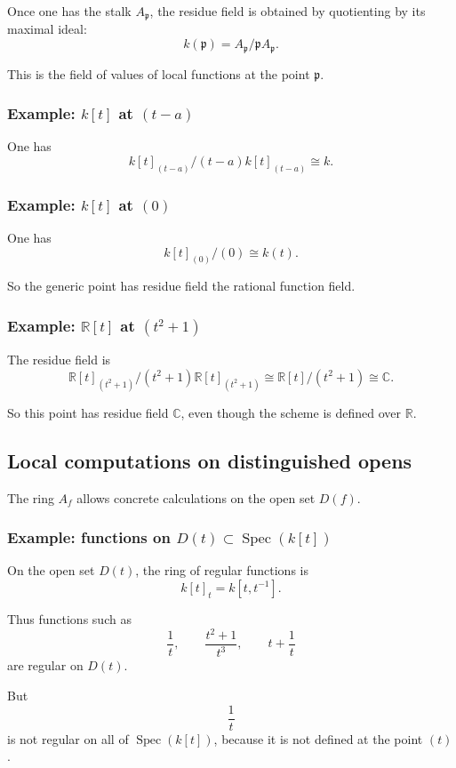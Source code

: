 \documentclass[12pt,a4paper]{article}
\theoremstyle{notespace}
\newcommand{\Spec}{\operatorname{Spec}}
\newcommand{\mf}{\mathfrak}
\theoremstyle{definition}
\begin{document}
Once one has the stalk \(A_{\mf p}\), the residue field is obtained by quotienting by its maximal ideal:
\[
k(\mf p)=A_{\mf p}/\mf p A_{\mf p}.
\]

This is the field of values of local functions at the point \(\mf p\).

\subsubsection{Example: \(k[t]\) at \((t-a)\)}

One has
\[
k[t]_{(t-a)}/(t-a)k[t]_{(t-a)}\cong k.
\]

\subsubsection{Example: \(k[t]\) at \((0)\)}

One has
\[
k[t]_{(0)}/(0)\cong k(t).
\]

So the generic point has residue field the rational function field.

\subsubsection{Example: \(\mathbb R[t]\) at \((t^2+1)\)}

The residue field is
\[
\mathbb R[t]_{(t^2+1)}/(t^2+1)\mathbb R[t]_{(t^2+1)}
\cong
\mathbb R[t]/(t^2+1)
\cong
\mathbb C.
\]

So this point has residue field \(\mathbb C\), even though the scheme is defined over \(\mathbb R\).

\subsection{Local computations on distinguished opens}

The ring \(A_f\) allows concrete calculations on the open set \(D(f)\).

\subsubsection{Example: functions on \(D(t)\subset \Spec(k[t])\)}

On the open set \(D(t)\), the ring of regular functions is
\[
k[t]_t=k[t,t^{-1}].
\]

Thus functions such as
\[
\frac{1}{t},
\qquad
\frac{t^2+1}{t^3},
\qquad
t+\frac{1}{t}
\]
are regular on \(D(t)\).

But
\[
\frac{1}{t}
\]
is not regular on all of \(\Spec(k[t])\), because it is not defined at the point \((t)\).
\end{document}
